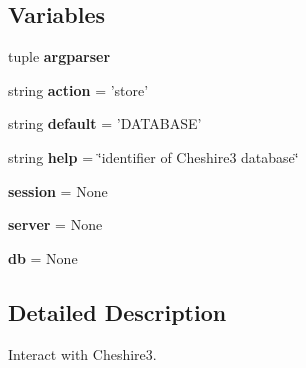 \subsection*{Variables}
\begin{DoxyCompactItemize}
\item 
tuple {\bfseries argparser}
\item 
\hypertarget{namespacecheshire3_1_1commands_1_1console_a70fd7b439b682fd289efb0934ac16f49}{string {\bfseries action} = 'store'}\label{namespacecheshire3_1_1commands_1_1console_a70fd7b439b682fd289efb0934ac16f49}

\item 
\hypertarget{namespacecheshire3_1_1commands_1_1console_adfb273fedcb1fadd8ecc16d46a73ae7a}{string {\bfseries default} = 'D\-A\-T\-A\-B\-A\-S\-E'}\label{namespacecheshire3_1_1commands_1_1console_adfb273fedcb1fadd8ecc16d46a73ae7a}

\item 
\hypertarget{namespacecheshire3_1_1commands_1_1console_aa1c50420a18f37ecc97519ff238a7852}{string {\bfseries help} = \char`\"{}identifier of Cheshire3 database\char`\"{}}\label{namespacecheshire3_1_1commands_1_1console_aa1c50420a18f37ecc97519ff238a7852}

\item 
\hypertarget{namespacecheshire3_1_1commands_1_1console_a26c1708d05f1f470b6b94f6d9fb2c968}{{\bfseries session} = None}\label{namespacecheshire3_1_1commands_1_1console_a26c1708d05f1f470b6b94f6d9fb2c968}

\item 
\hypertarget{namespacecheshire3_1_1commands_1_1console_a57592e413f1486bad34075273add12d7}{{\bfseries server} = None}\label{namespacecheshire3_1_1commands_1_1console_a57592e413f1486bad34075273add12d7}

\item 
\hypertarget{namespacecheshire3_1_1commands_1_1console_aa9a2f503e4afdbb7c73e9711d0d507d8}{{\bfseries db} = None}\label{namespacecheshire3_1_1commands_1_1console_aa9a2f503e4afdbb7c73e9711d0d507d8}

\end{DoxyCompactItemize}


\subsection{Detailed Description}
\begin{DoxyVerb}Interact with Cheshire3.\end{DoxyVerb}
 

